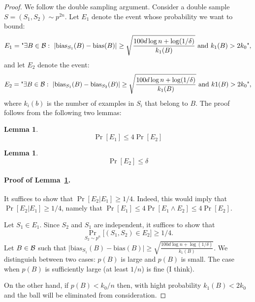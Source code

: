 \documentclass{article}
\newtheorem{lemma}[theorem]{Lemma}
\newcommand{\B}{{\cal B}}
\newcommand{\bias}{\text{bias}}
\newcommand{\samp}{S}
\begin{document}
\begin{proof}
We follow the double sampling argument.
Consider a double sample $S=(\samp_1,\samp_2)\sim p^{2n}$.
Let $E_1$ denote the event whose probability we want to bound:
\[
E_1 = \text{"}\exists {B\in\B}:~\lvert \bias_{\samp_1}(B) -
\bias(B)\rvert \geq \sqrt{\frac{100d\log n + \log(1/\delta)}{k_1(B)}}
\mbox{ and } k_1(B)>2k_0
\text{"}, 
\]
and let $E_2$ denote the event:
\[
E_2 = \text{"}\exists {B\in\B}:~\lvert \bias_{\samp_1}(B) -  \bias_{\samp_2}(B)\rvert \geq \sqrt{\frac{100d\log n + \log(1/\delta)}{k_1(B)}}
  \mbox{ and } k1(B)>2k_0
  \text{"},
\]
where $k_i(b)$ is the number of examples in $S_i$ that belong to $B$.
The proof follows from the following two lemmas:
\begin{lemma}\label{lem:aux1}
\[\Pr[E_1]\leq 4\Pr[E_2]\]
\end{lemma}
\begin{lemma}
\[\Pr[E_2]\leq \delta\]
\end{lemma}

\paragraph{Proof of Lemma~\ref{lem:aux1}.}

It suffices to show that $\Pr[E_2 \vert E_1]\geq 1/4$.
Indeed, this would imply that $\Pr[E_2 \vert E_1]\geq 1/4$, 
namely that $\Pr[E_1] \leq 4\Pr[E_1 \land E_2]\leq 4\Pr[E_2]$.

Let $S_1\in E_1$. Since $S_2$ and $S_1$ are independent,
it suffices to show that 
\[\Pr_{S_2\sim p^n}\bigl[(S_1,S_2)\in E_2\bigr] \geq 1/4.\]
Let $B\in\B$ such that $\lvert \bias_{\samp_1}(B) -  \bias(B)\rvert \geq \sqrt{\frac{100d\log n + \log(1/\delta)}{k_1(B)} }$.
We distinguish between two cases: $p(B)$ is large and $p(B)$ is small.
The case when $p(B)$ is sufficiently large (at least $1/n$) is fine (I think).

On the other hand, if $p(B)<k_0/n$ then, with hight probability
$k_1(B)<2k_0$ and the ball will be eliminated from consideration.

\iffalse
Further assume that $\bias(B) = 0.8$,  that $\bias_{\samp_1}(B)=0$, and that $k_1(B)$
is sufficiently large so the $\lvert \bias_{\samp_1}(B) -  \bias(B)\rvert \geq \sqrt{\frac{100d\log n + \log(1/\delta)}{k_1(B)} }$.
Now, since $p(B) \leq 1/1000n$ it follows that $k_2(B)=0$ with probability at least $0.99$.
Now, it is plausible to define $\bias_{\samp_2}(B)=0$ when $k_2(B)=0$,
and therefore we get that $\bias_{\samp_2}=\bias_{\samp_1}=0$ with probability at least $0.99$ and so the event $E_2$ occurs with probability less than $0.01$,
unlike what we wanted.
\fi
\end{proof}
\end{document}
